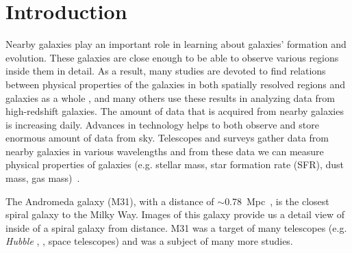 \section{Introduction} %

Nearby galaxies play an important role in learning about galaxies' formation and evolution.
These galaxies are close enough to be able to observe various regions inside them in detail.
As a result, many studies are devoted to find relations between physical properties of the galaxies in both spatially resolved regions and galaxies as a whole%
, and many others use these results in analyzing data from high-redshift galaxies. %
The amount of data that is acquired from nearby galaxies is increasing daily.
Advances in technology helps to both observe and store enormous amount of data from sky.%
Telescopes and surveys gather data from nearby galaxies in various wavelengths and from these data we can measure physical properties of galaxies (e.g. stellar mass, star formation rate (SFR), dust mass, gas mass)~\citep[e.g.][]{Calzetti07,Dale09,Eskew12}.

The Andromeda galaxy (M31), with a distance of $\sim$0.78~Mpc~\citep{McConnachie05}, is the closest spiral galaxy to the Milky Way.
Images of this galaxy provide us a detail view of inside of a spiral galaxy from distance.
M31 was a target of many telescopes (e.g. {\it Hubble} \citep{Dalcanton12}, \Spitzer\citep{Wener04}, \Herschel\citep{Pilbratt10} space telescopes) and was a subject of many more studies. %

